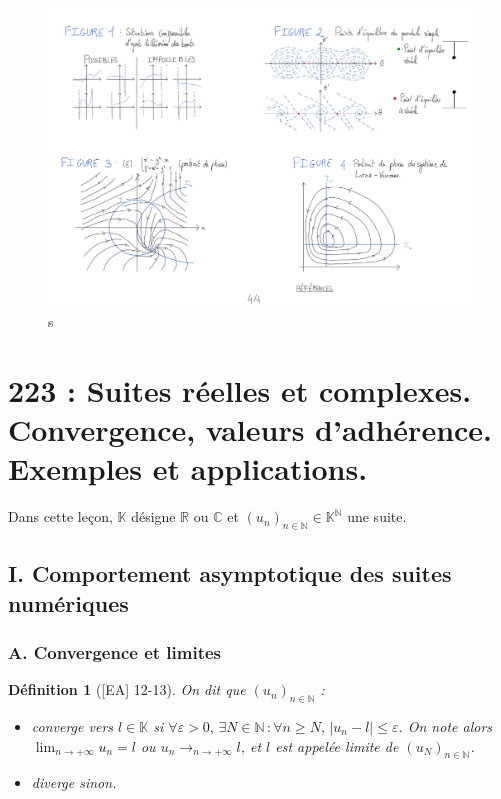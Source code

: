 \documentclass[10pt, a4paper, parskip=full, twoside, twocolumn]{report}
\newtheorem{definition}{Définition}
\newcommand{\IN}{\mathbb{N}}
\newcommand{\IK}{\mathbb{K}}
\newcommand{\IC}{\mathbb{C}}
\newcommand{\IR}{\mathbb{R}}
\begin{document}
\begin{figure}[!htb]
	\centering
	\includegraphics[trim={0 0 0 0},clip,width=1\linewidth]{img/220.pdf}
	\caption{s}
\end{figure}


\chapter*{223 : Suites réelles et complexes. Convergence, valeurs d’adhérence. Exemples et applications.}
\setcounter{definition}{0}

\textcolor{paragraphtext}{Dans cette leçon, $\IK$ désigne $\IR$ ou $\IC$ et $\left(u_n\right)_{n\in\IN}\in\IK^{\IN}$ une suite.}

\section*{I. Comportement asymptotique des suites numériques}
\subsection*{A. Convergence et limites}

\begin{definition}[\textnormal{[EA] 12-13}]
	On dit que $\left(u_n\right)_{n\in\IN}$ :
	\begin{itemize}
		\item \emph{converge vers $l\in\IK$} si $\forall \varepsilon >0,\, \exists N\in\IN\,\colon \forall n\geq N,\, \vert u_n - l\vert \leq \varepsilon$. On note alors $\lim_{n\to +\infty} u_n = l$ ou $u_n\longrightarrow_{n\to +\infty} l$, et $l$ est appelée \emph{limite de $\left(u_N\right)_{n\in\IN}$.}
		\item \emph{diverge} sinon.
	\end{itemize}
\end{definition}
\end{document}
